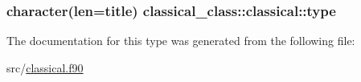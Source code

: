 \hypertarget{structclassical__class_1_1classical_a4c835c43f9359c512790ebce83387d63}{
\subsubsection[{type}]{\setlength{\rightskip}{0pt plus 5cm}character(len=title) classical\+\_\+class\+::classical\+::type\hspace{0.3cm}{\ttfamily [private]}}}\label{structclassical__class_1_1classical_a4c835c43f9359c512790ebce83387d63}


The documentation for this type was generated from the following file\+:\begin{DoxyCompactItemize}
\item 
src/\hyperlink{classical_8f90}{classical.\+f90}\end{DoxyCompactItemize}
